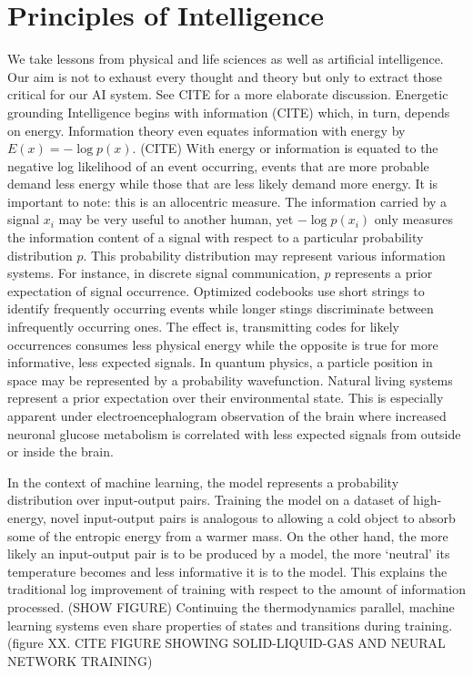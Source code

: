 \documentclass{article}
\begin{document}
\section{Principles of Intelligence}

We take lessons from physical and life sciences as well as artificial intelligence. Our aim is not to exhaust every thought and theory but only to extract those critical for our AI system. See CITE for a more elaborate discussion.
Energetic grounding
Intelligence begins with information (CITE) which, in turn, depends on energy. Information theory even equates information with energy by $E(x) = - \log{p(x)} $. (CITE) With energy or information is equated to the negative log likelihood of an event occurring, events that are more probable demand less energy while those that are less likely demand more energy. It is important to note: this is an allocentric measure. The information carried by a signal $x_i$ may be very useful to another human, yet $- \log{p(x_i)}$ only measures the information content of a signal with respect to a particular probability distribution $p$. This probability distribution may represent various information systems. For instance, in discrete signal communication, $p$ represents a prior expectation of signal occurrence. Optimized codebooks use short strings to identify frequently occurring events while longer stings discriminate between infrequently occurring ones. The effect is, transmitting codes for likely occurrences consumes less physical energy while the opposite is true for more informative, less expected signals. In quantum physics, a particle position in space may be represented by a probability wavefunction. Natural living systems represent a prior expectation over their environmental state. 
This is especially apparent under electroencephalogram observation of the brain where increased neuronal glucose metabolism is correlated with less expected signals from outside or inside the brain. 

In the context of machine learning, the model represents a probability distribution over input-output pairs. Training the model on a dataset of high-energy, novel input-output pairs is analogous to allowing a cold object to absorb some of the entropic energy from a warmer mass. On the other hand, the more likely an input-output pair is to be produced by a model, the more ‘neutral’ its temperature becomes and less informative it is to the model. This explains the traditional log improvement of training with respect to the amount of information processed. (SHOW FIGURE) Continuing the thermodynamics parallel, machine learning systems even share properties of states and transitions during training. (figure XX. CITE FIGURE SHOWING SOLID-LIQUID-GAS AND NEURAL NETWORK TRAINING)
\end{document}
